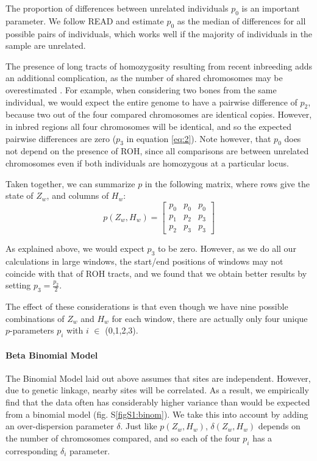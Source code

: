 \documentclass[12pt, letterpaper]{article}
\begin{document}
The proportion of differences between unrelated individuals $p_0$ is an important parameter. We follow READ \cite{kuhn_estimating_2018} and estimate $p_0$ as the median of differences for all possible pairs of individuals, which works well if the majority of individuals in the sample are unrelated.

The presence of long tracts of homozygosity resulting from recent inbreeding adds an additional complication, as the number of shared chromosomes may be overestimated \cite{weir_genetic_2006}. For example, when considering two bones from the same individual, we would expect the entire genome to have a pairwise difference of $p_2$, because two out of the four compared chromosomes are identical copies. However, in inbred regions all four chromosomes will be identical, and so the expected pairwise differences are zero ($p_3$ in equation \ref{eq:2}). Note however, that $p_0$ does not depend on the presence of ROH, since all comparisons are between unrelated chromosomes even if both individuals are homozygous at a particular locus. 

Taken together, we can summarize $p$ in the following matrix, where rows give the state of $Z_w$, and columns of $H_w$:
\begin{equation}\label{eq:2}
    p(Z_w, H_w) = \left[\begin{array}
{rrr}
p_0 & p_0 & p_0 \\
p_1 & p_2 & p_3 \\
p_2 & p_3 & p_3
\end{array}\right]
\end{equation}

As explained above, we would expect $p_3$ to be zero. However, as we do all our calculations in large windows, the start/end positions of windows may not coincide with that of ROH tracts, and we found that we obtain better results by setting $p_3 = \frac{p_2}{2}$.

The effect of these considerations is that even though we have nine possible combinations of $Z_w$ and $H_w$ for each window, there are actually only four unique $p$-parameters $p_i$ with $i$ $\in$ (0,1,2,3). 

\paragraph{Beta Binomial Model}
The Binomial Model laid out above assumes that sites are independent. However, due to genetic linkage, nearby sites will be correlated. As a result, we empirically find that the data often has considerably higher variance than would be expected from a binomial model (fig. S\ref{figS1:binom}). We take this into account by adding an over-dispersion parameter $\delta$. Just like $p(Z_w,H_w)$, $\delta(Z_w,H_w)$ depends on the number of chromosomes compared, and so each of the  four $p_i$ has a corresponding $\delta_i$ parameter. 
\end{document}
